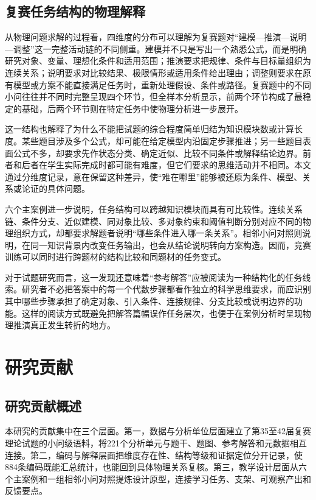 \documentclass[
  12pt,
  a4paper,twoside,openany]{ctexbook}
\begin{document}
\subsection{复赛任务结构的物理解释}\label{ux590dux8d5bux4efbux52a1ux7ed3ux6784ux7684ux7269ux7406ux89e3ux91ca}

从物理问题求解的过程看，四维度的分布可以理解为复赛题对``建模---推演---说明---调整''这一完整活动链的不同侧重。建模并不只是写出一个熟悉公式，而是明确研究对象、变量、理想化条件和适用范围；推演要求把规律、条件与目标量组织为连续关系；说明要求对比较结果、极限情形或适用条件给出理由；调整则要求在原有模型或方案不能直接满足任务时，重新处理假设、条件或路径。复赛题中的不同小问往往并不同时完整呈现四个环节，但全样本分析显示，前两个环节构成了最稳定的基础，后两个环节则在特定任务中使物理分析进一步展开。

这一结构也解释了为什么不能把试题的综合程度简单归结为知识模块数或计算长度。某些题目涉及多个公式，却可能在给定模型内沿固定步骤推进；另一些题目表面公式不多，却要求先作状态分类、确定近似、比较不同条件或解释结论边界。前者和后者在学生实际完成时都可能有难度，但它们要求的思维活动并不相同。本文通过分维度记录，意在保留这种差异，使``难在哪里''能够被还原为条件、模型、关系或论证的具体问题。

六个主案例进一步说明，任务结构可以跨越知识模块而具有可比较性。连续关系链、条件分支、近似建模、同对象比较、多对象约束和阈值判断分别对应不同的物理组织方式，却都要求解题者说明``哪些条件进入哪一条关系''。相邻小问对照则说明，在同一知识背景内改变任务输出，也会从结论说明转向方案构造。因而，竞赛训练可以同时进行跨题材的结构比较和同题材的任务变式。

对于试题研究而言，这一发现还意味着``参考解答''应被阅读为一种结构化的任务线索。研究者不必把答案中的每一个代数步骤都看作独立的科学思维要求，而应识别其中哪些步骤承担了确定对象、引入条件、连接规律、分支比较或说明边界的功能。这样的阅读方式既避免把解答篇幅误作任务层次，也便于在案例分析时呈现物理推演真正发生转折的地方。

\section{研究贡献}\label{ux7814ux7a76ux8d21ux732e}

\subsection{研究贡献概述}\label{ux7814ux7a76ux8d21ux732eux6982ux8ff0}

本研究的贡献集中在三个层面。第一，数据与分析单位层面建立了第35至42届复赛理论试题的小问级语料，将221个分析单元与题干、题图、参考解答和元数据相互连接。第二，编码与解释层面把维度存在性、结构等级和证据定位分开记录，使884条编码既能汇总统计，也能回到具体物理关系复核。第三，教学设计层面从六个主案例和一组相邻小问对照提炼设计原型，连接学习任务、支架、可观察产出和反馈要点。
\end{document}
